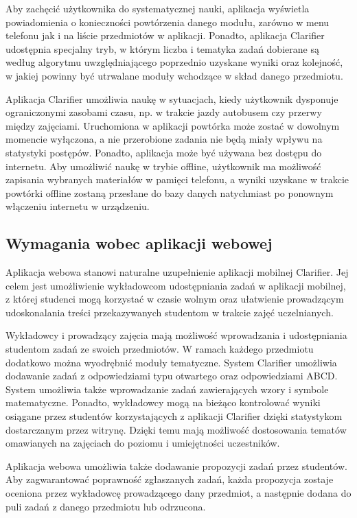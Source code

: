 \documentclass{pracamgr}
\begin{document}
Aby zachęcić użytkownika do systematycznej nauki, aplikacja wyświetla powiadomienia o konieczności powtórzenia danego modułu, zarówno w menu telefonu jak i na liście przedmiotów w aplikacji. Ponadto, aplikacja Clarifier udostępnia specjalny tryb, w którym liczba i tematyka zadań dobierane są według algorytmu uwzględniającego poprzednio uzyskane wyniki oraz kolejność, w jakiej powinny być utrwalane moduły wchodzące w skład danego przedmiotu.  

Aplikacja Clarifier umożliwia naukę w sytuacjach, kiedy użytkownik dysponuje ograniczonymi zasobami czasu, np. w trakcie jazdy autobusem czy przerwy między zajęciami. Uruchomiona w aplikacji powtórka może zostać w dowolnym momencie wyłączona, a nie przerobione zadania nie będą miały wpływu na statystyki postępów. Ponadto, aplikacja może być używana bez dostępu do internetu. Aby umożliwić naukę w trybie offline, użytkownik ma możliwość zapisania wybranych materiałów w pamięci telefonu, a wyniki uzyskane w trakcie powtórki offline zostaną przesłane do bazy danych natychmiast po ponownym włączeniu internetu w urządzeniu.

\subsection{Wymagania wobec aplikacji webowej}
Aplikacja webowa stanowi naturalne uzupełnienie aplikacji mobilnej Clarifier. Jej celem jest umożliwienie wykładowcom udostępniania zadań w aplikacji mobilnej, z której studenci mogą korzystać w czasie wolnym oraz ułatwienie prowadzącym udoskonalania treści przekazywanych studentom w trakcie zajęć uczelnianych. 

Wykładowcy i prowadzący zajęcia mają możliwość wprowadzania i udostępniania studentom zadań ze swoich przedmiotów. W ramach każdego przedmiotu dodatkowo można wyodrębnić moduły tematyczne. System Clarifier umożliwia dodawanie zadań z odpowiedziami typu otwartego oraz odpowiedziami ABCD. System umożliwia także wprowadzanie zadań zawierających wzory i symbole matematyczne. Ponadto, wykładowcy mogą na bieżąco kontrolować wyniki osiągane przez studentów korzystających z aplikacji Clarifier dzięki statystykom dostarczanym przez witrynę. Dzięki temu mają możliwość dostosowania tematów omawianych na zajęciach do poziomu i umiejętności uczestników.

Aplikacja webowa umożliwia także dodawanie propozycji zadań przez studentów. Aby zagwarantować poprawność zgłaszanych zadań, każda propozycja zostaje oceniona przez wykładowcę prowadzącego dany przedmiot, a następnie dodana do puli zadań z danego przedmiotu lub odrzucona.
\end{document}
